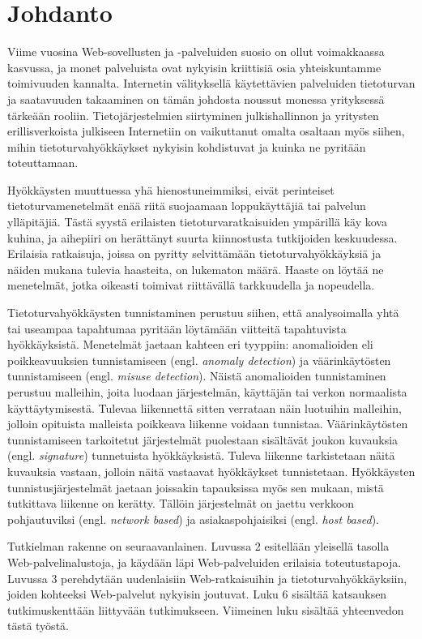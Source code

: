 
\chapter{Johdanto}

Viime vuosina Web-sovellusten ja -palveluiden suosio on 
ollut voimakkaassa kasvussa, ja monet palveluista ovat nykyisin kriittisiä osia
yhteiskuntamme toimivuuden kannalta. Internetin välityksellä
käytettävien palveluiden tietoturvan ja saatavuuden takaaminen on
tämän johdosta noussut monessa yrityksessä tärkeään rooliin.
Tietojärjestelmien siirtyminen julkishallinnon ja
yritysten erillisverkoista julkiseen Internetiin on vaikuttanut omalta
osaltaan myös siihen, mihin tietoturvahyökkäykset nykyisin
kohdistuvat ja kuinka ne pyritään toteuttamaan.

Hyökkäysten muuttuessa yhä hienostuneimmiksi, eivät perinteiset
tietoturvamenetelmät enää riitä suojaamaan loppukäyttäjiä tai palvelun
ylläpitäjiä. Tästä syystä erilaisten tietoturvaratkaisuiden ympärillä
käy kova kuhina, ja aihepiiri on herättänyt suurta kiinnostusta
tutkijoiden keskuudessa. Erilaisia ratkaisuja, joissa on pyritty
selvittämään tietoturvahyökkäyksiä ja näiden mukana tulevia haasteita,
on lukematon määrä. Haaste on löytää ne menetelmät, jotka oikeasti
toimivat riittävällä tarkkuudella ja nopeudella.

Tietoturvahyökkäysten tunnistaminen perustuu siihen, että
analysoimalla yhtä tai useampaa tapahtumaa pyritään löytämään
viitteitä tapahtuvista hyökkäyksistä. Menetelmät jaetaan kahteen eri
tyyppiin: anomalioiden eli poikkeavuuksien tunnistamiseen
(engl. \textit{anomaly detection}) ja väärinkäytösten tunnistamiseen
(engl. \textit{misuse detection}). Näistä anomalioiden tunnistaminen
perustuu malleihin, joita luodaan järjestelmän, käyttäjän tai verkon
normaalista käyttäytymisestä. Tulevaa liikennettä sitten verrataan 
näin luotuihin malleihin, jolloin opituista malleista poikkeava liikenne
voidaan tunnistaa. Väärinkäytösten tunnistamiseen tarkoitetut järjestelmät 
puolestaan sisältävät joukon kuvauksia (engl. \textit{signature}) tunnetuista hyökkäyksistä. 
Tuleva liikenne tarkistetaan näitä kuvauksia vastaan, jolloin näitä vastaavat
hyökkäykset tunnistetaan. Hyökkäysten tunnistusjärjestelmät
jaetaan joissakin tapauksissa myös sen mukaan, mistä tutkittava
liikenne on kerätty. Tällöin järjestelmät on jaettu verkkoon
pohjautuviksi (engl. \textit{network based}) ja asiakaspohjaisiksi
(engl. \textit{host based}).

Tutkielman rakenne on seuraavanlainen. Luvussa 2 esitellään yleisellä
tasolla Web-palvelinalustoja, ja käydään läpi Web-palveluiden
erilaisia toteutustapoja. Luvussa 3 perehdytään uudenlaisiin
Web-ratkaisuihin ja tietoturvahyökkäyksiin, joiden kohteeksi
Web-palvelut nykyisin joutuvat. Luku 6 sisältää katsauksen
tutkimuskenttään liittyvään tutkimukseen. Viimeinen luku sisältää
yhteenvedon tästä työstä.
